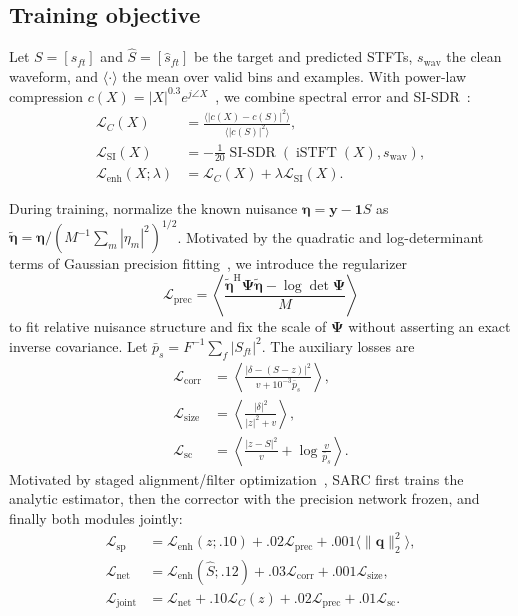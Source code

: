 \documentclass{article}
\begin{document}
\subsection{Training objective}
\label{sec:training}

Let $S=[s_{ft}]$ and $\widehat S=[\widehat s_{ft}]$ be the target and predicted STFTs, $s_{\mathrm{wav}}$ the clean waveform, and $\langle\cdot\rangle$ the mean over valid bins and examples. With power-law compression $c(X)=|X|^{0.3}e^{j\angle X}$~\cite{braun2021losses}, we combine spectral error and SI-SDR~\cite{leroux2019sisdr}:
\begin{align}
\mathcal L_C(X)&=\frac{\langle|c(X)-c(S)|^2\rangle}
{\langle|c(S)|^2\rangle},\nonumber\\
\mathcal L_{\mathrm{SI}}(X)&=-\frac1{20}\operatorname{SI\mbox{-}SDR}
(\operatorname{iSTFT}(X),s_{\mathrm{wav}}),\nonumber\\
\mathcal L_{\mathrm{enh}}(X;\lambda)&=\mathcal L_C(X)+
\lambda\mathcal L_{\mathrm{SI}}(X).
\label{eq:signal_losses}
\end{align}

During training, normalize the known nuisance $\boldsymbol\eta=\mathbf y-\mathbf1S$ as $\widetilde{\boldsymbol\eta}=\boldsymbol\eta/(M^{-1}\sum_m|\eta_m|^2)^{1/2}$. Motivated by the quadratic and log-determinant terms of Gaussian precision fitting~\cite{PRML}, we introduce the regularizer
\begin{equation}
\mathcal L_{\mathrm{prec}}=\left\langle
\frac{\widetilde{\boldsymbol\eta}^{\mathrm H}\boldsymbol\Psi
\widetilde{\boldsymbol\eta}-\log\det\boldsymbol\Psi}{M}
\right\rangle
\label{eq:precision_loss}
\end{equation}
to fit relative nuisance structure and fix the scale of $\boldsymbol\Psi$ without asserting an exact inverse covariance. Let $\bar p_s=F^{-1}\sum_f|S_{ft}|^2$. The auxiliary losses are
\begin{align}
\mathcal L_{\mathrm{corr}}&=\left\langle\frac{|\delta-(S-z)|^2}
{v+10^{-3}\bar p_s}\right\rangle,\nonumber\\
\mathcal L_{\mathrm{size}}&=\left\langle\frac{|\delta|^2}
{|z|^2+v}\right\rangle,\nonumber\\
\mathcal L_{\mathrm{sc}}&=\left\langle\frac{|z-S|^2}{v}
+\log\frac{v}{\bar p_s}\right\rangle.
\label{eq:auxiliary_losses}
\end{align}
Motivated by staged alignment/filter optimization~\cite{lee2025afnet}, SARC first trains the analytic estimator, then the corrector with the precision network frozen, and finally both modules jointly:
\begin{align}
\mathcal L_{\mathrm{sp}}&=\mathcal L_{\mathrm{enh}}(z;.10)
+.02\mathcal L_{\mathrm{prec}}+.001\langle\|\mathbf q\|_2^2\rangle,\nonumber\\
\mathcal L_{\mathrm{net}}&=\mathcal L_{\mathrm{enh}}(\widehat S;.12)
+.03\mathcal L_{\mathrm{corr}}+.001\mathcal L_{\mathrm{size}},\nonumber\\
\mathcal L_{\mathrm{joint}}&=\mathcal L_{\mathrm{net}}+.10\mathcal L_C(z)
+.02\mathcal L_{\mathrm{prec}}+.01\mathcal L_{\mathrm{sc}}.
\label{eq:stage_objectives}
\end{align}
\end{document}
